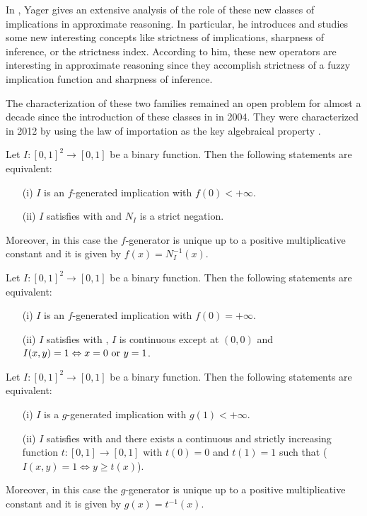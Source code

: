 In \cite{Yager2004}, Yager gives an extensive analysis of the role of these new classes of implications in approximate reasoning. In particular, he introduces and studies some new interesting concepts like strictness of implications, sharpness of inference, or the strictness index. According to him, these new operators are interesting in approximate reasoning since they accomplish strictness of a fuzzy implication function and sharpness of inference.

The characterization of these two families remained an open problem for almost a decade since the introduction of these classes in \cite{Yager2004} in 2004. They were characterized in 2012 by using the law of importation as the key algebraical property \cite{Massanet2012B}.

\begin{theorem} 
	\label{thm:Char_F_1}
	Let $I:[0,1]^2\to [0,1]$ be a binary function. Then the following statements are equivalent:
	\begin{enumerate}
		\item[(i)] $I$ is an $f$-generated implication with $f(0)<+\infty$.
		\item[(ii)] $I$ satisfies \LI with \TP and $N_I$ is a strict negation.
	\end{enumerate}
	Moreover, in this case the $f$-generator is unique up to a positive multiplicative constant and it is given by $f(x)=N_I^{-1}(x)$. 
\end{theorem}

\begin{theorem} 
	\label{thm:Char_F_Inf}
	Let $I:[0,1]^2\to [0,1]$ be a binary function. Then the following statements are equivalent:
	\begin{enumerate}
		\item[(i)] $I$ is an $f$-generated implication with $f(0)=+\infty$.
		\item[(ii)] $I$ satisfies \LI with \TP, $I$ is continuous except at $(0,0)$ and $I(x,y)=1 \Leftrightarrow x=0 \hbox{ or } y=1$. 
	\end{enumerate}
\end{theorem}

\begin{theorem} 
	\label{thm:Char_G_1}
	Let $I:[0,1]^2\to [0,1]$ be a binary function. Then the following statements are equivalent:
	\begin{enumerate}
		\item[(i)] $I$ is a $g$-generated implication with $g(1)<+\infty$.
		\item[(ii)] $I$ satisfies \LI with \TP and there exists a continuous and strictly increasing function $t:[0,1] \to [0,1]$ with $t(0)=0$ and $t(1)=1$ such that ($I(x,y) = 1 \Leftrightarrow y \geq t(x)$).
	\end{enumerate}
	Moreover, in this case the $g$-generator is unique up to a positive multiplicative constant and it is given by $g(x)=t^{-1}(x)$. 
\end{theorem}

